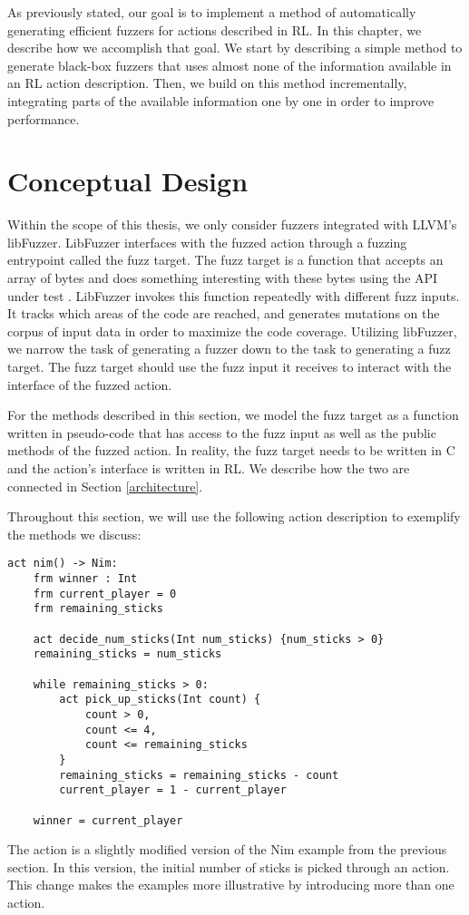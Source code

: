 
As previously stated, our goal is to implement a method of automatically generating
 efficient fuzzers for actions described in RL.
In this chapter, we describe how we accomplish that goal.
We start by describing a simple method to generate black-box fuzzers that uses almost none of the information available in an RL action description.
Then, we build on this method incrementally, integrating parts of the available information one by one in order to improve performance.

\section{Conceptual Design}
Within the scope of this thesis, we only consider fuzzers integrated with LLVM's libFuzzer.
LibFuzzer interfaces with the fuzzed action through a fuzzing entrypoint called the fuzz target.
The fuzz target is a function that accepts an array of bytes and does something interesting with these bytes using the API under test \cite{LibFuzzer}.
LibFuzzer invokes this function repeatedly with different fuzz inputs. It tracks which areas of the code are reached, and generates mutations on the corpus of input data in order to maximize the code coverage.
Utilizing libFuzzer, we narrow the task of generating a fuzzer down to the task to generating a fuzz target.
The fuzz target should use the fuzz input it receives to interact with the interface of the fuzzed action.

For the methods described in this section, we model the fuzz target as a function written in pseudo-code that has access to the fuzz input as well
 as the public methods of the fuzzed action.
In reality, the fuzz target needs to be written in C and the action's interface is written in RL. We describe how the two are connected in Section \ref{architecture}.

Throughout this section, we will use the following action description to exemplify the methods we discuss:
\begin{lstlisting}
act nim() -> Nim:
    frm winner : Int
    frm current_player = 0
    frm remaining_sticks

    act decide_num_sticks(Int num_sticks) {num_sticks > 0}
    remaining_sticks = num_sticks

    while remaining_sticks > 0:
        act pick_up_sticks(Int count) {
            count > 0,
            count <= 4,
            count <= remaining_sticks
        }
        remaining_sticks = remaining_sticks - count
        current_player = 1 - current_player

    winner = current_player
\end{lstlisting}
The action is a slightly modified version of the Nim example from the previous section.
In this version, the initial number of sticks is picked through an action. This change makes the examples more illustrative by introducing more than one action.


